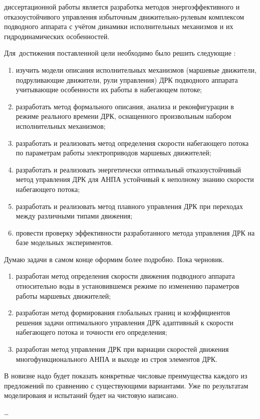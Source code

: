 {\aim} диссертационной работы является разработка методов энергоэффективного и отказоустойчивого управления избыточным движительно-рулевым комплексом подводного аппарата с учётом динамики исполнительных механизмов и их гидродинамических особенностей.

Для~достижения поставленной цели необходимо было решить следующие {\tasks}:
\begin{enumerate}[beginpenalty=10000] %
  \item изучить модели описания исполнительных механизмов (маршевые движители, подруливающие движители, рули управления) ДРК подводного аппарата учитывающие особенности их работы в набегающем потоке;
  \item разработать метод формального описания, анализа и реконфигурации в режиме реального времени ДРК, оснащенного произвольным набором исполнительных механизмов;
  \item разработать и реализовать метод определения скорости набегающего потока по параметрам работы электроприводов маршевых движителей;
  \item разработать и реализовать энергетически оптимальный отказоустойчивый метод управления ДРК для АНПА устойчивый к неполному знанию скорости набегающего потока;
  \item разработать и реализовать метод плавного управления ДРК при переходах между различными типами движения;
  \item провести проверку эффективности разработанного метода управления ДРК на базе модельных экспериментов.
\end{enumerate}
\begin{noteplan}
    Думаю задачи в самом конце оформим более подробно. Пока черновик.
\end{noteplan}

{\novelty}
\begin{enumerate}[beginpenalty=10000] %
  \item разработан метод определения скорости движения подводного аппарата относительно воды в установившемся режиме по изменению параметров работы маршевых движителей;
  \item разработан метод формирования глобальных границ и коэффициентов решения задачи оптимального управления ДРК адаптивный к скорости набегающего потока и точности его определения;
  \item разработан метод управления ДРК при вариации скоростей движения многофункционального АНПА и выходе из строя элементов ДРК.
\end{enumerate}
\begin{noteplan}
    В новизне надо будет показать конкретные числовые преимущества каждого из предложений по сравнению с существующими вариантами. Уже по результатам моделироваия и испытаний будет на чистовую написано.
\end{noteplan}
{\influence} \ldots

